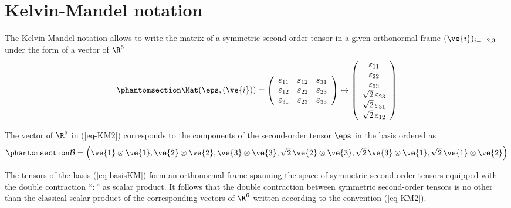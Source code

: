 \documentclass[
  letterpaper,
  DIV=11,
  numbers=noendperiod]{scrreprt}
\begin{document}
\section{Kelvin-Mandel notation}\label{sec-KM}

The Kelvin-Mandel notation allows to write the matrix of a symmetric
second-order tensor in a given orthonormal frame
\mbox{$(\ve{i})_{i=1,2,3}$} under the form of a vector of \(\R^6\)
\begin{equation}\phantomsection\label{eq-KM2}{
   \Mat(\eps,(\ve{i}))=
   \left(
   \begin{array}{ccc}
   \varepsilon_{11} & \varepsilon_{12} & \varepsilon_{31}\\
   \varepsilon_{12} & \varepsilon_{22} & \varepsilon_{23}\\
   \varepsilon_{31} & \varepsilon_{23} & \varepsilon_{33}
   \end{array}
   \right)
   \mapsto
   \left(
   \begin{array}{c}
   \varepsilon_{11} \\
   \varepsilon_{22} \\
   \varepsilon_{33} \\
   \sqrt{2}\,\varepsilon_{23} \\
   \sqrt{2}\,\varepsilon_{31} \\
   \sqrt{2}\,\varepsilon_{12}
   \end{array}
   \right)
}\end{equation}

The vector of \(\R^6\) in (\ref{eq-KM2}) corresponds to the components
of the second-order tensor \(\eps\) in the basis ordered as
\begin{equation}\phantomsection\label{eq-basisKM}{
\mathcal{B}=\left(
\ve{1}\otimes\ve{1},
\ve{2}\otimes\ve{2},
\ve{3}\otimes\ve{3},
\sqrt{2}\,\ve{2}\otimes\ve{3},
\sqrt{2}\,\ve{3}\otimes\ve{1},
\sqrt{2}\,\ve{1}\otimes\ve{2}
\right)
}\end{equation}

The tensors of the basis (\ref{eq-basisKM}) form an orthonormal frame
spanning the space of symmetric second-order tensors equipped with the
double contraction ``\(:\)'' as scalar product. It follows that the
double contraction between symmetric second-order tensors is no other
than the classical scalar product of the corresponding vectors of
\(\R^6\) written according to the convention (\ref{eq-KM2}).
\end{document}
